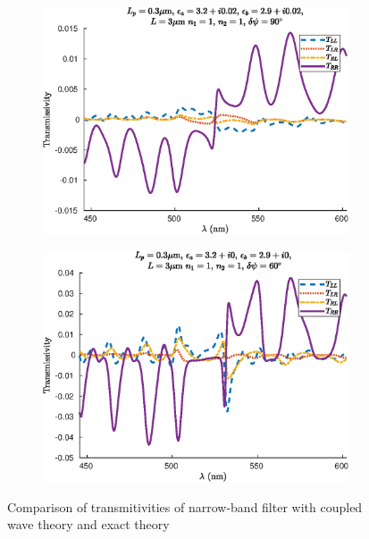 \begin{figure}
\begin{subfigure}{0.49\linewidth}
		\includegraphics[width=\linewidth]{plots/defect/reflectivity_losses/comparison_transmission}
		\caption{}
	\end{subfigure}
	\begin{subfigure}{0.49\linewidth}
		\includegraphics[width=\linewidth]{plots/defect/reflectivity_other_defect/comparison_transmission}
		\caption{}
	\end{subfigure}
	\caption[Comparison of transmitivities of the narrow-band filter]{Comparison of transmitivities of narrow-band filter with coupled wave theory and exact theory}
	\label{fig:transmitivities_narrow_appendix_comp}
\end{figure}